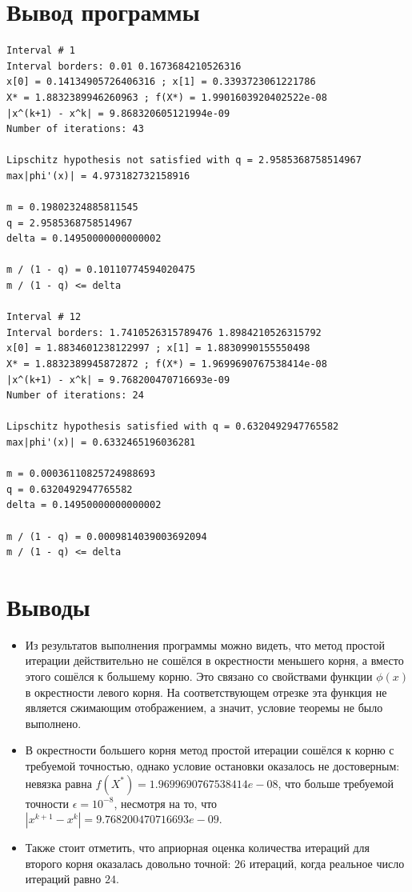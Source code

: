 \documentclass[14pt, a4paper]{article}
\begin{document}
  \section{Вывод программы}
\begin{verbatim}
Interval # 1
Interval borders: 0.01 0.1673684210526316
x[0] = 0.14134905726406316 ; x[1] = 0.3393723061221786
X* = 1.8832389946260963 ; f(X*) = 1.9901603920402522e-08
|x^(k+1) - x^k| = 9.868320605121994e-09
Number of iterations: 43

Lipschitz hypothesis not satisfied with q = 2.9585368758514967
max|phi'(x)| = 4.973182732158916

m = 0.19802324885811545
q = 2.9585368758514967
delta = 0.14950000000000002

m / (1 - q) = 0.10110774594020475
m / (1 - q) <= delta

Interval # 12
Interval borders: 1.7410526315789476 1.8984210526315792
x[0] = 1.8834601238122997 ; x[1] = 1.8830990155550498
X* = 1.8832389945872872 ; f(X*) = 1.9699690767538414e-08
|x^(k+1) - x^k| = 9.768200470716693e-09
Number of iterations: 24

Lipschitz hypothesis satisfied with q = 0.6320492947765582
max|phi'(x)| = 0.6332465196036281

m = 0.00036110825724988693
q = 0.6320492947765582
delta = 0.14950000000000002

m / (1 - q) = 0.0009814039003692094
m / (1 - q) <= delta
\end{verbatim}

  \section{Выводы}
  \begin{itemize}
  \item
  Из результатов выполнения программы можно видеть, что метод простой итерации действительно не сошёлся в окрестности меньшего корня, а вместо этого сошёлся к большему корню. Это связано со свойствами функции $\phi(x)$ в окрестности левого корня.
  На соответствующем отрезке эта функция не является сжимающим отображением, а значит, условие теоремы не было выполнено.
  \item
  В окрестности большего корня метод простой итерации сошёлся к корню с требуемой точностью, однако условие остановки оказалось не достоверным: невязка равна $f(X^*) = 1.9699690767538414e-08$, что больше требуемой точности $\epsilon = 10^{-8}$,
  несмотря на то, что $|x^{k+1} - x^k| = 9.768200470716693e-09$.
  \item
  Также стоит отметить, что априорная оценка количества итераций для второго корня оказалась довольно точной: $26$ итераций, когда реальное число итераций равно $24$. 
  \end{itemize}
\end{document}
